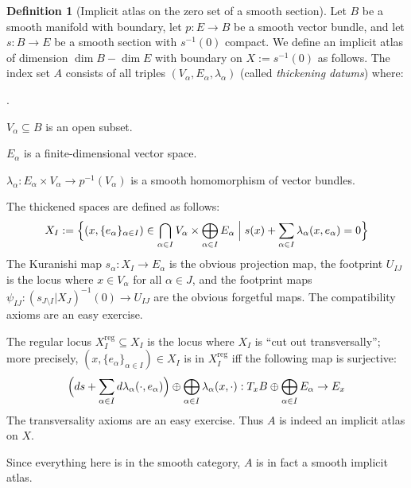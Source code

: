 \documentclass[12pt]{article}
\theoremstyle{definition}
\newtheorem{definition}[theorem]{Definition}
\theoremstyle{remark}
\numberwithin{equation}{subsection}
\newcommand{\reg}{\mathrm{reg}}
\newcounter{rcounti}
\newenvironment{rlist}{\begin{list}{\roman{rcounti}.}{\usecounter{rcounti}
\setlength\itemsep{0pt}
\setlength\labelsep{4pt}
\setlength\labelwidth{16pt}
\setlength\leftmargin{32pt}
\setlength\listparindent{0pt}
\setlength\parsep{0pt}
\setlength\parskip{0pt}
\setlength\partopsep{0pt}
\setlength\rightmargin{0pt}
\setlength\topsep{0pt}
\setlength\itemindent{0pt}
}}{\end{list}}
\begin{document}
\begin{definition}[Implicit atlas on the zero set of a smooth section]\label{IAonvectorbundlezeroset}
Let $B$ be a smooth manifold with boundary, let $p:E\to B$ be a smooth vector bundle, and let $s:B\to E$ be a smooth section with $s^{-1}(0)$ compact.  We define an implicit atlas of dimension $\dim B-\dim E$ with boundary on $X:=s^{-1}(0)$ as follows.  The index set $A$ consists of all triples $(V_\alpha,E_\alpha,\lambda_\alpha)$ (called \emph{thickening datums}) where:
\begin{rlist}
\item$V_\alpha\subseteq B$ is an open subset.
\item$E_\alpha$ is a finite-dimensional vector space.
\item$\lambda_\alpha:E_\alpha\times V_\alpha\to p^{-1}(V_\alpha)$ is a smooth homomorphism of vector bundles.
\end{rlist}
The thickened spaces are defined as follows:
\begin{equation}
X_I:=\Bigl\{(x,\{e_\alpha\}_{\alpha\in I})\in\bigcap_{\alpha\in I}V_\alpha\times\bigoplus_{\alpha\in I}E_\alpha\Bigm|s(x)+\sum_{\alpha\in I}\lambda_\alpha(x,e_\alpha)=0\Bigr\}
\end{equation}
The Kuranishi map $s_\alpha:X_I\to E_\alpha$ is the obvious projection map, the footprint $U_{IJ}$ is the locus where $x\in V_\alpha$ for all $\alpha\in J$, and the footprint maps $\psi_{IJ}:(s_{J\setminus I}|X_J)^{-1}(0)\to U_{IJ}$ are the obvious forgetful maps.  The compatibility axioms are an easy exercise.

The regular locus $X_I^\reg\subseteq X_I$ is the locus where $X_I$ is ``cut out transversally''; more precisely, $(x,\{e_\alpha\}_{\alpha\in I})\in X_I$ is in $X_I^\reg$ iff the following map is surjective:
\begin{equation}
\Bigl(ds+\sum_{\alpha\in I}d\lambda_\alpha(\cdot,e_\alpha)\Bigr)\oplus\bigoplus_{\alpha\in I}\lambda_\alpha(x,\cdot):T_xB\oplus\bigoplus_{\alpha\in I}E_\alpha\to E_x
\end{equation}
The transversality axioms are an easy exercise.  Thus $A$ is indeed an implicit atlas on $X$.

Since everything here is in the smooth category, $A$ is in fact a smooth implicit atlas.
\end{definition}
\end{document}
